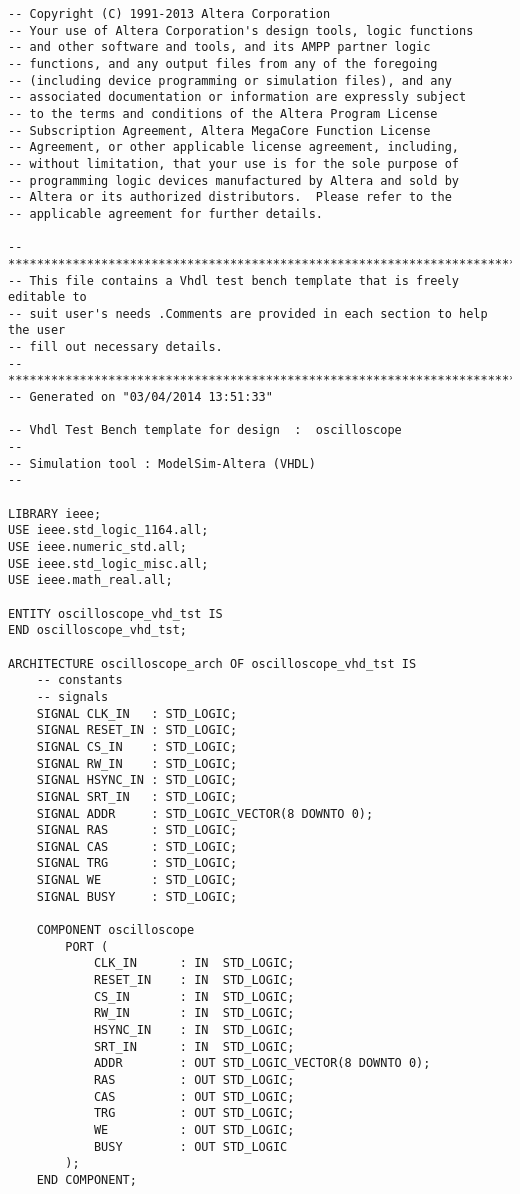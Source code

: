 \lstset{language=[niosii]Assembler}
\begin{lstlisting}
-- Copyright (C) 1991-2013 Altera Corporation
-- Your use of Altera Corporation's design tools, logic functions 
-- and other software and tools, and its AMPP partner logic 
-- functions, and any output files from any of the foregoing 
-- (including device programming or simulation files), and any 
-- associated documentation or information are expressly subject 
-- to the terms and conditions of the Altera Program License 
-- Subscription Agreement, Altera MegaCore Function License 
-- Agreement, or other applicable license agreement, including, 
-- without limitation, that your use is for the sole purpose of 
-- programming logic devices manufactured by Altera and sold by 
-- Altera or its authorized distributors.  Please refer to the 
-- applicable agreement for further details.

-- ***************************************************************************
-- This file contains a Vhdl test bench template that is freely editable to   
-- suit user's needs .Comments are provided in each section to help the user  
-- fill out necessary details.                                                
-- ***************************************************************************
-- Generated on "03/04/2014 13:51:33"
                                                            
-- Vhdl Test Bench template for design  :  oscilloscope
-- 
-- Simulation tool : ModelSim-Altera (VHDL)
-- 

LIBRARY ieee;                                               
USE ieee.std_logic_1164.all;      
USE ieee.numeric_std.all;                                
USE ieee.std_logic_misc.all;
USE ieee.math_real.all;                                   

ENTITY oscilloscope_vhd_tst IS
END oscilloscope_vhd_tst;

ARCHITECTURE oscilloscope_arch OF oscilloscope_vhd_tst IS
	-- constants                                                 
	-- signals                                                   
	SIGNAL CLK_IN 	: STD_LOGIC;
	SIGNAL RESET_IN : STD_LOGIC;
	SIGNAL CS_IN 	: STD_LOGIC;
	SIGNAL RW_IN 	: STD_LOGIC;
	SIGNAL HSYNC_IN : STD_LOGIC;
	SIGNAL SRT_IN 	: STD_LOGIC;
	SIGNAL ADDR 	: STD_LOGIC_VECTOR(8 DOWNTO 0);
	SIGNAL RAS 		: STD_LOGIC;
	SIGNAL CAS 		: STD_LOGIC;
	SIGNAL TRG 		: STD_LOGIC;
	SIGNAL WE 		: STD_LOGIC;
	SIGNAL BUSY		: STD_LOGIC;

	COMPONENT oscilloscope
		PORT (
			CLK_IN 		: IN  STD_LOGIC;
			RESET_IN 	: IN  STD_LOGIC;
			CS_IN 		: IN  STD_LOGIC;
			RW_IN 		: IN  STD_LOGIC;
			HSYNC_IN 	: IN  STD_LOGIC;
			SRT_IN 		: IN  STD_LOGIC;
			ADDR 		: OUT STD_LOGIC_VECTOR(8 DOWNTO 0);
			RAS 		: OUT STD_LOGIC;
			CAS 		: OUT STD_LOGIC;
			TRG 		: OUT STD_LOGIC;
			WE 			: OUT STD_LOGIC;
			BUSY		: OUT STD_LOGIC
		);
	END COMPONENT;


\end{lstlisting}
